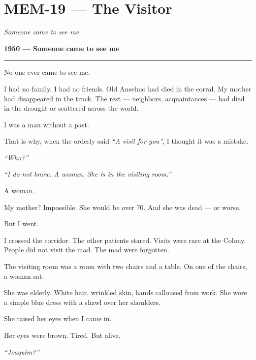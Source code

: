 \section*{\textbf{MEM-19} --- The Visitor}

\noindent \textit{Someone came to see me}

\noindent \textbf{1950 --- Someone came to see me}

\vspace{0.5em}\noindent\rule{\textwidth}{0.5pt}\vspace{0.5em}

\noindent No one ever came to see me.

\noindent I had no family. I had no friends. Old Anselmo had died in the corral. My mother had disappeared in the truck. The rest --- neighbors, acquaintances --- had died in the drought or scattered across the world.

\noindent I was a man without a past.

\noindent That is why, when the orderly said \textit{\textquotedblleft{}A visit for you\textquotedblright{}}, I thought it was a mistake.

\noindent \textit{\textquotedblleft{}Who?\textquotedblright{}}

\noindent \textit{\textquotedblleft{}I do not know. A woman. She is in the visiting room.\textquotedblright{}}

\noindent A woman.

\noindent My mother? Impossible. She would be over 70. And she was dead --- or worse.

\noindent But I went.

\noindent I crossed the corridor. The other patients stared. Visits were rare at the Colony. People did not visit the mad. The mad were forgotten.

\noindent The visiting room was a room with two chairs and a table. On one of the chairs, a woman sat.

\noindent She was elderly. White hair, wrinkled skin, hands calloused from work. She wore a simple blue dress with a shawl over her shoulders.

\noindent She raised her eyes when I came in.

\noindent Her eyes were brown. Tired. But alive.

\noindent \textit{\textquotedblleft{}Joaquim?\textquotedblright{}}

